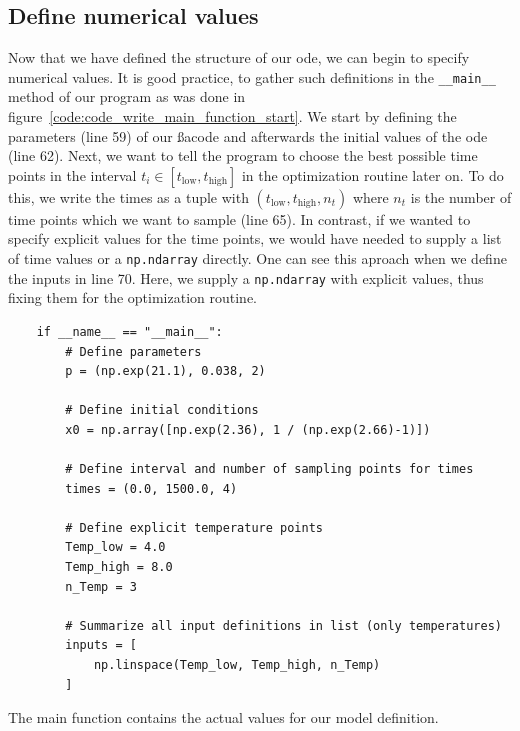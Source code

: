 \documentclass[10pt,A4paper]{article}
\begin{document}
\subsection*{Define numerical values}
Now that we have defined the structure of our \ac{ode}, we can begin to specify numerical values.
It is good practice, to gather such definitions in the \texttt{__main__} method of our program as was done in figure~\ref{code:code_write_main_function_start}.
We start by defining the parameters (line 59) of our ßac{ode} and afterwards the initial values of the \ac{ode} (line 62).
Next, we want to tell the program to choose the best possible time points in the interval $t_i\in\left[t_\text{low},t_\text{high}\right]$ in the optimization routine later on.
To do this, we write the times as a tuple with $(t_\text{low}, t_\text{high}, n_t)$ where $n_t$ is the number of time points which we want to sample (line 65).
In contrast, if we wanted to specify explicit values for the time points, we would have needed to supply a list of time values or a \texttt{np.ndarray} directly.
One can see this aproach when we define the inputs in line 70.
Here, we supply a \texttt{np.ndarray} with explicit values, thus fixing them for the optimization routine.
\begin{code}[h]
    \begin{verbatim}
    if __name__ == "__main__":
        # Define parameters
        p = (np.exp(21.1), 0.038, 2)

        # Define initial conditions
        x0 = np.array([np.exp(2.36), 1 / (np.exp(2.66)-1)])

        # Define interval and number of sampling points for times
        times = (0.0, 1500.0, 4)

        # Define explicit temperature points
        Temp_low = 4.0
        Temp_high = 8.0
        n_Temp = 3

        # Summarize all input definitions in list (only temperatures)
        inputs = [
            np.linspace(Temp_low, Temp_high, n_Temp)
        ]
    \end{verbatim}
    \caption{The main function contains the actual values for our model definition.}
    \label{code:code_write_main_function_start}
\end{code}
\end{document}
